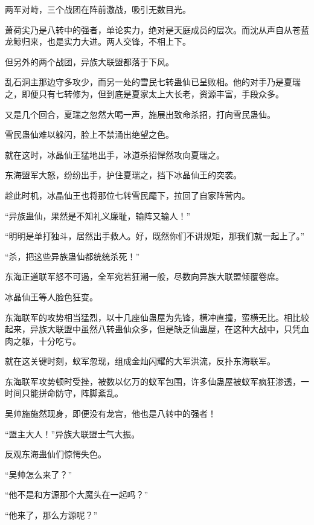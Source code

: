
\begin{this_body}

两军对峙，三个战团在阵前激战，吸引无数目光。

萧荷尖乃是八转中的强者，单论实力，绝对是天庭成员的层次。而沈从声自从苍蓝龙鲸归来，也是实力大进。两人交锋，不相上下。

但另外的两个战团，异族大联盟都落于下风。

乱石洞主那边守多攻少，而另一处的雪民七转蛊仙已呈败相。他的对手乃是夏瑞之，即便只有七转修为，但到底是夏家太上大长老，资源丰富，手段众多。

又是几个回合，夏瑞之忽然大喝一声，施展出致命杀招，打向雪民蛊仙。

雪民蛊仙难以躲闪，脸上不禁涌出绝望之色。

就在这时，冰晶仙王猛地出手，冰道杀招悍然攻向夏瑞之。

东海盟军大怒，纷纷出手，护住夏瑞之，挡下冰晶仙王的突袭。

趁此时机，冰晶仙王也将那位七转雪民麾下，拉回了自家阵营内。

“异族蛊仙，果然是不知礼义廉耻，输阵又输人！”

“明明是单打独斗，居然出手救人。好，既然你们不讲规矩，那我们就一起上了。”

“杀，把这些异族蛊仙都统统杀死！”

东海正道联军怒不可遏，全军宛若狂潮一般，尽数向异族大联盟倾覆卷席。

冰晶仙王等人脸色狂变。

东海联军的攻势相当猛烈，以十几座仙蛊屋为先锋，横冲直撞，蛮横无比。相比较起来，异族大联盟中虽然八转蛊仙众多，但是缺乏仙蛊屋，在这种大战中，只凭血肉之躯，十分吃亏。

就在这关键时刻，蚁军忽现，组成金灿闪耀的大军洪流，反扑东海联军。

东海联军攻势顿时受挫，被数以亿万的蚁军包围，许多仙蛊屋被蚁军疯狂渗透，一时间只能拼命防守，阵脚紊乱。

吴帅施施然现身，即便没有龙宫，他也是八转中的强者！

“盟主大人！”异族大联盟士气大振。

反观东海蛊仙们惊愕失色。

“吴帅怎么来了？”

“他不是和方源那个大魔头在一起吗？”

“他来了，那么方源呢？”


\end{this_body}
